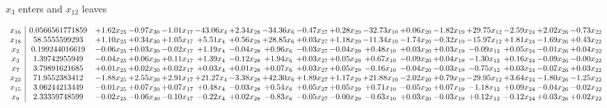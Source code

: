 \documentclass[9pt]{article}
\begin{document}
 $ x_{3} $ enters and $ x_{12} $ leaves 

 \[\begin{array}{c| c c@{\hskip 2pt} c@{\hskip 2pt} c@{\hskip 2pt} c@{\hskip 2pt} c@{\hskip 2pt} c@{\hskip 2pt} c@{\hskip 2pt} c@{\hskip 2pt} c@{\hskip 2pt} c@{\hskip 2pt} c@{\hskip 2pt} c@{\hskip 2pt} c@{\hskip 2pt} c@{\hskip 2pt} c@{\hskip 2pt} }
 x_{16}   &  0.0566561771859 & +  1.62 x_{25} & -0.97 x_{30} & -1.01 x_{17} & -43.06 x_{4} & +  2.34 x_{28} & -34.36 x_{6} & -0.47 x_{27} & +  0.28 x_{29} & -32.73 x_{10} & +  0.06 x_{20} & -1.82 x_{19} & + 29.75 x_{12} & -2.59 x_{24} & +  2.02 x_{26} & -0.73 x_{22}\\
 x_{18}   &  58.5555599293 & +  1.10 x_{25} & +  0.34 x_{30} & +  1.05 x_{17} & +  5.51 x_{4} & +  0.56 x_{28} & + 28.85 x_{6} & +  0.03 x_{27} & +  1.18 x_{29} & -11.34 x_{10} & -1.74 x_{20} & -0.32 x_{19} & -15.97 x_{12} & +  1.81 x_{24} & -1.69 x_{26} & +  0.43 x_{22}\\
 x_{2}   &  0.199244016619 & -0.06 x_{25} & +  0.03 x_{30} & -0.02 x_{17} & +  1.19 x_{4} & -0.04 x_{28} & +  0.96 x_{6} & -0.03 x_{27} & -0.04 x_{29} & +  0.48 x_{10} & +  0.03 x_{20} & +  0.03 x_{19} & -0.09 x_{12} & +  0.05 x_{24} & -0.01 x_{26} & +  0.04 x_{22}\\
 x_{3}   &  1.39742955949 & -0.04 x_{25} & +  0.06 x_{30} & +  0.11 x_{17} & +  1.39 x_{4} & -0.12 x_{28} & +  1.94 x_{6} & +  0.03 x_{27} & +  0.05 x_{29} & +  0.67 x_{10} & -0.09 x_{20} & +  0.04 x_{19} & -1.30 x_{12} & +  0.16 x_{24} & -0.09 x_{26} & -0.00 x_{22}\\
 x_{7}   &  3.79891621685 & +  0.01 x_{25} & +  0.02 x_{30} & +  0.02 x_{17} & +  0.03 x_{4} & +  0.01 x_{28} & +  0.07 x_{6} & +  0.03 x_{27} & +  0.05 x_{29} & -0.16 x_{10} & -0.04 x_{20} & -0.03 x_{19} & -0.75 x_{12} & +  0.03 x_{24} & -0.07 x_{26} & +  0.03 x_{22}\\
 x_{23}   &  71.9552383412 & -1.88 x_{25} & +  2.55 x_{30} & +  2.91 x_{17} & + 21.27 x_{4} & -3.38 x_{28} & + 42.30 x_{6} & +  1.89 x_{27} & +  1.17 x_{29} & + 21.88 x_{10} & -2.02 x_{20} & +  0.79 x_{19} & -29.95 x_{12} & +  3.64 x_{24} & -1.80 x_{26} & -1.25 x_{22}\\
 x_{15}   &  3.06244213449 & -0.01 x_{25} & +  0.07 x_{30} & +  0.07 x_{17} & +  0.48 x_{4} & -0.03 x_{28} & +  0.54 x_{6} & +  0.05 x_{27} & +  0.05 x_{29} & +  0.71 x_{10} & -0.05 x_{20} & +  0.07 x_{19} & -1.18 x_{12} & +  0.09 x_{24} & -0.04 x_{26} & -0.02 x_{22}\\
 x_{9}   &  2.33359748599 & -0.02 x_{25} & -0.06 x_{30} & -0.10 x_{17} & -0.22 x_{4} & +  0.02 x_{28} & -0.83 x_{6} & -0.05 x_{27} & -0.00 x_{29} & -0.63 x_{10} & +  0.03 x_{20} & -0.03 x_{19} & +  0.12 x_{12} & -0.12 x_{24} & +  0.03 x_{26} & +  0.02 x_{22}\\

\end{array}\]
\end{document}
